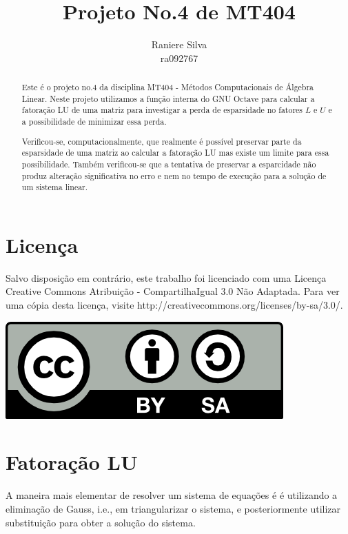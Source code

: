 \documentclass[12pt,a4paper]{article}
\begin{document}
\title{Projeto No.4 de MT404}
\author{Raniere Silva \\ ra092767}
\maketitle
\begin{abstract}
    Este \'{e} o projeto no.4 da disciplina MT404 - M\'{e}todos Computacionais
    de \'{A}lgebra Linear. Neste projeto utilizamos a função interna do GNU
    Octave para calcular a fatoração LU de uma matriz para investigar a perda de
    esparsidade no fatores $L$ e $U$ e a possibilidade de minimizar essa perda.

    Verificou-se, computacionalmente, que realmente é possível preservar parte
    da esparsidade de uma matriz ao calcular a fatoração LU mas existe um limite
    para essa possibilidade. Também verificou-se que a tentativa de preservar a
    esparcidade não produz alteração significativa no erro e nem no tempo de
    execução para a solução de um sistema linear.
\end{abstract}
\tableofcontents
\lstlistoflistings
\section*{Licen\c{c}a}
Salvo disposi\c{c}\~{a}o em contr\'{a}rio, este trabalho foi licenciado com uma
Licen\c{c}a Creative Commons Atribui\c{c}\~{a}o - CompartilhaIgual 3.0 N\~{a}o
Adaptada. Para ver uma c\'{o}pia desta licen\c{c}a, visite
http://creativecommons.org/licenses/by-sa/3.0/.
\begin{center}
    \includegraphics{../figuras/cc-by-sa.png}
\end{center}
\newpage
\section{Fatora\c{c}\~{a}o LU}
A maneira mais elementar de resolver um sistema de equa\c{c}\~{o}es \'{e} \'{e}
utilizando a elimina\c{c}\~{a}o de Gauss, i.e., em triangularizar o
sistema, e posteriormente utilizar substitui\c{c}\~{a}o para obter a
solu\c{c}\~{a}o do sistema.
\end{document}
